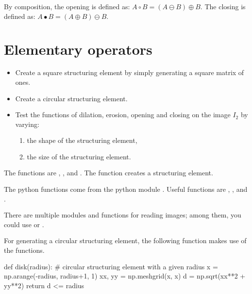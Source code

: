 By composition, the opening is defined as:
$A \circ B  = (A \ominus B) \oplus B$.
The closing is defined as:
$A \bullet B  = (A \oplus B) \ominus B $.

\section{Elementary operators}
\begin{qbox}
\begin{itemize}
\item Create a square structuring element by simply generating a square matrix of ones.
\item Create a circular structuring element.
 \item 
Test the functions  of dilation, erosion, opening and closing on the image $I_2$ by varying:
\begin{enumerate}
	\item the shape of the structuring element,
	\item the size of the structuring element.
\end{enumerate}
\end{itemize}

\end{qbox}

\begin{mcomment}
\begin{mremark}
The \matlabregistered{} functions are , ,  and . The func\-tion  creates a structuring element.
\end{mremark}
\end{mcomment}
\begin{pcomment}
\begin{premark}
The python functions come from the python module . Useful func\-tions are , , 
  and
. 

There are multiple modules and functions for reading images; among them, you could use  or .
\end{premark}

For generating a circular structuring element, the following function makes use of the  functions.
\begin{python}
def disk(radius):
    # circular structuring element with a given radius
    x = np.arange(-radius, radius+1, 1)
    xx, yy = np.meshgrid(x, x)
    d = np.sqrt(xx**2 + yy**2)
    return d <= radius
\end{python}

\end{pcomment}

